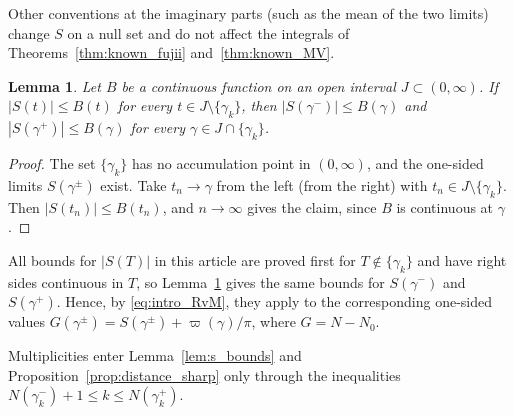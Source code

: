 \documentclass[11pt,a4paper]{article}
\makeatletter
\numberwithin{equation}{section}
\DeclareRobustCommand{\CGref}[1]{\ref{#1}}
\DeclareRobustCommand{\CGeqref}[1]{\eqref{#1}}
\let\CG@origref\ref
\let\CG@origeqref\eqref
\newcommand{\CG@gettip}[1]{\@ifundefined{CGTip@#1}{#1}{\csname CGTip@#1\endcsname}}
\DeclareRobustCommand{\CGref}[1]{\pdftooltip{\CG@origref{#1}}{\CG@gettip{#1}}}
\DeclareRobustCommand{\CGeqref}[1]{\pdftooltip{\CG@origeqref{#1}}{\CG@gettip{#1}}}
\newtheorem{lemma}[theorem]{Lemma}
\theoremstyle{definition}
\theoremstyle{remark}
\newcommand{\Nz}{N_0} %
\makeatother
\begin{document}
Other conventions at the imaginary parts (such as the mean of the two limits) change $S$ on a null set and do not affect the integrals of Theorems~\CGref{thm:known_fujii} and~\CGref{thm:known_MV}.

\begin{lemma}\label{lem:onesided}
Let $B$ be a continuous function on an open interval $J\subset(0,\infty)$. If $|S(t)|\le B(t)$ for every $t\in J\setminus\{\gamma_k\}$, then $|S(\gamma^-)|\le B(\gamma)$ and $|S(\gamma^+)|\le B(\gamma)$ for every $\gamma\in J\cap\{\gamma_k\}$.
\end{lemma}

\begin{proof}
The set $\{\gamma_k\}$ has no accumulation point in $(0,\infty)$, and the one-sided limits $S(\gamma^\pm)$ exist. Take $t_n\to\gamma$ from the left (from the right) with $t_n\in J\setminus\{\gamma_k\}$. Then $|S(t_n)|\le B(t_n)$, and $n\to\infty$ gives the claim, since $B$ is continuous at $\gamma$.
\end{proof}

All bounds for $|S(T)|$ in this article are proved first for $T\notin\{\gamma_k\}$ and have right sides continuous in $T$, so Lemma~\CGref{lem:onesided} gives the same bounds for $S(\gamma^-)$ and $S(\gamma^+)$. Hence, by \CGeqref{eq:intro_RvM}, they apply to the corresponding one-sided values $G(\gamma^\pm)=S(\gamma^\pm)+\varpi(\gamma)/\pi$, where $G=N-\Nz$.

Multiplicities enter Lemma~\CGref{lem:s_bounds} and Proposition~\CGref{prop:distance_sharp} only through the inequalities $N(\gamma_k^-)+1\le k\le N(\gamma_k^+)$.
\end{document}
